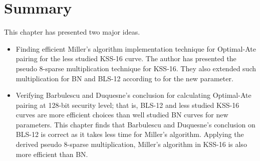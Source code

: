 \section{Summary}
This chapter has presented two major ideas.
\begin{itemize}
	\item Finding efficient Miller's algorithm implementation technique for Optimal-Ate pairing for the less studied KSS-16 curve. The author has presented the pseudo 8-sparse multiplication technique for KSS-16. They also extended such multiplication for BN and BLS-12 according to \cite{PAIRING:MANS13} for the new parameter. 
	\item Verifying Barbulescu and Duquesne's conclusion \cite{EPRINT:BarDuq17} for calculating Optimal-Ate pairing at 128-bit security level; that is, BLS-12 and less studied KSS-16 curves are more efficient choices than well studied BN curves for new parameters. 
	This chapter finds that Barbulescu and Duquesne's conclusion on BLS-12 is correct as it takes less time for Miller's algorithm.
	Applying the derived pseudo 8-sparse multiplication, Miller's algorithm in KSS-16 is also more efficient than BN.
\end{itemize}
